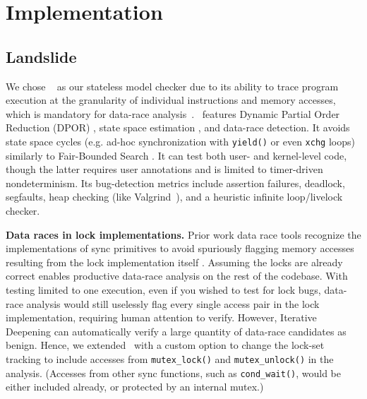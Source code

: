 

\section{Implementation}

\subsection{Landslide}
\label{sec:landslide}

We chose \landslide~\cite{landslide} as our stateless model checker due to its ability to trace program execution at the granularity of individual instructions and memory accesses, which is mandatory for data-race analysis~\cite{eraser}.
\landslide~features Dynamic Partial Order Reduction (DPOR) \cite{dpor}, state space estimation \cite{estimation}, and data-race detection.
It avoids state space cycles (e.g. ad-hoc synchronization with {\tt yield()} or even {\tt xchg} loops) similarly to Fair-Bounded Search \cite{bpor}. %
It can test both user- and kernel-level code, though the latter requires user annotations and is limited to timer-driven nondeterminism.
Its bug-detection metrics include assertion failures, deadlock, segfaults, heap checking (like Valgrind~\cite{valgrind}), and a heuristic infinite loop/livelock checker.

{\bf Data races in lock implementations.}
Prior work data race tools recognize the implementations of sync primitives to avoid spuriously flagging memory accesses resulting from the lock implementation itself \cite{tsan}.
Assuming the locks are already correct enables productive data-race analysis on the rest of the codebase.
With testing limited to one execution, even if you wished to test for lock bugs, data-race analysis would still uselessly flag every single access pair in the lock implementation, requiring human attention to verify.
However, Iterative Deepening can automatically verify a large quantity of data-race candidates as benign.
Hence, we extended \landslide~with a custom option to change the lock-set tracking to include accesses from {\tt mutex\_lock()} and {\tt mutex\_unlock()} in the analysis. (Accesses from other sync functions, such as {\tt cond\_wait()}, would be either included already, or protected by an internal mutex.)

